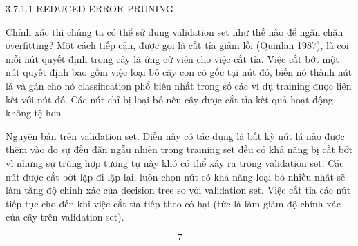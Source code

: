 3.7.1.1 REDUCED ERROR PRUNING

Chính xác thì chúng ta có thể sử dụng validation set như thế nào để ngăn chặn overfitting? Một cách tiếp cận, được gọi là cắt tỉa giảm lỗi (Quinlan 1987), là coi mỗi nút quyết định trong cây là ứng cử viên cho việc cắt tỉa. Việc cắt bớt một nút quyết định bao gồm việc loại bỏ cây con có gốc tại nút đó, biến nó thành nút lá và gán cho nó classification phổ biến nhất trong số các ví dụ training được liên kết với nút đó. Các nút chỉ bị loại bỏ nếu cây được cắt tỉa kết quả hoạt động không tệ hơn

Nguyên bản trên validation set. Điều này có tác dụng là bất kỳ nút lá nào được thêm vào do sự đều đặn ngẫu nhiên trong training set đều có khả năng bị cắt bớt vì những sự trùng hợp tương tự này khó có thể xảy ra trong validation set. Các nút được cắt bớt lặp đi lặp lại, luôn chọn nút có khả năng loại bỏ nhiều nhất sẽ làm tăng độ chính xác của decision tree so với validation set. Việc cắt tỉa các nút tiếp tục cho đến khi việc cắt tỉa tiếp theo có hại (tức là làm giảm độ chính xác của cây trên validation set).

\[7\]

